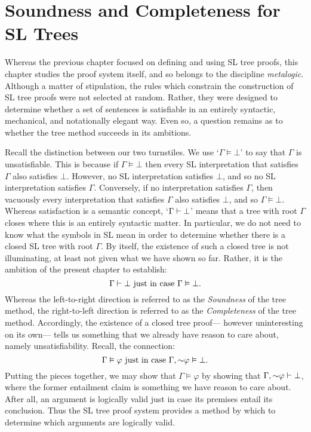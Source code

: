 \chapter{Soundness and Completeness for SL Trees}
\label{ch.SLsoundcomplete}

Whereas the previous chapter focused on defining and using SL tree proofs, this chapter studies the proof system itself, and so belongs to the discipline \emph{metalogic}.
Although a matter of stipulation, the rules which constrain the construction of SL tree proofs were not selected at random.
Rather, they were designed to determine whether a set of sentences is satisfiable in an entirely syntactic, mechanical, and notationally elegant way.
Even so, a question remains as to whether the tree method succeeds in its ambitions.

Recall the distinction between our two turnstiles.
We use `$\Gamma \models \bot$' to say that $\Gamma$ is unsatisfiable.
This is because if $\Gamma \models \bot$ then every SL interpretation that satisfies $\Gamma$ also satisfies $\bot$.
However, no SL interpretation satisfies $\bot$, and so no SL interpretation satisfies $\Gamma$.
Conversely, if no interpretation satisfies $\Gamma$, then vacuously every interpretation that satisfies $\Gamma$ also satisfies $\bot$, and so $\Gamma \models \bot$.
Whereas satisfaction is a semantic concept, `$\Gamma \vdash \bot$' means that a tree with root $\Gamma$ closes where this is an entirely syntactic matter.
In particular, we do not need to know what the symbols in SL mean in order to determine whether there is a closed SL tree with root $\Gamma$.
By itself, the existence of such a closed tree is not illuminating, at least not given what we have shown so far.
Rather, it is the ambition of the present chapter to establish:
  $$\Gamma \vdash \bot \text{ just in case } \Gamma \vDash \bot.$$
Whereas the left-to-right direction is referred to as the \textit{Soundness} of the tree method, the right-to-left direction is referred to as the \textit{Completeness} of the tree method.
Accordingly, the existence of a closed tree proof--- however uninteresting on its own--- tells us something that we already have reason to care about, namely unsatisfiability.
Recall, the connection: %
    $$\Gamma \models \varphi \text{ just in case } \Gamma, \enot \varphi \models \bot.$$
Putting the pieces together, we may show that $\Gamma \models \varphi$ by showing that $\Gamma, \enot \varphi \proves \bot$, where the former entailment claim is something we have reason to care about.
After all, an argument is logically valid just in case its premises entail its conclusion.
Thus the SL tree proof system provides a method by which to determine which arguments are logically valid.





